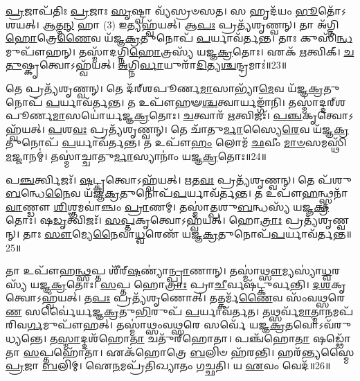 \-\ul{𑌪𑍍𑌰}\-𑌜𑌾\-𑌪᳴𑌤𑌿𑌃 \ul{𑌪𑍍𑌰}\-𑌜𑌾𑌃 \ul{𑌸𑍃}\-𑌷𑍍𑌟𑍍𑌵𑌾 𑌵𑍍𑌯᳴𑌸𑍍𑌰𑍞𑌸𑌤।
𑌸 𑌹𑍃𑌦᳴𑌯𑌂 \ul{𑌭𑍂}\-𑌤𑍋᳴\-𑌽𑌶𑌯𑌤𑍍।
𑌆\-\ul{𑌤𑍍𑌮}\-\-\ul{𑌨𑍍} 𑌹𑌾 (3) 𑌇𑌤𑍍𑌯𑌹𑍍𑌵᳴𑌯𑌤𑍍।
𑌆\-\ul{𑌪𑌃} 𑌪𑍍𑌰𑌤𑍍𑌯᳴𑌶𑍃𑌣𑍍𑌵𑌨𑍍।
𑌤𑌾 𑌅᳴𑌗𑍍𑌨𑌿\-\ul{𑌹𑍋}\-𑌤𑍍𑌰𑍇\-\ul{𑌣𑍈}\-𑌵 𑌯᳴𑌜𑍍𑌞\-\ul{𑌕𑍍𑌰}\-𑌤𑍁𑌨𑍋𑌪᳴ \ul{𑌪}\-𑌰𑍍𑌯𑌾𑌵᳴𑌰𑍍𑌤𑌨𑍍𑌤।
𑌤𑌾𑌃 𑌕𑍁𑌸𑌿᳴\-\ul{𑌨𑍍𑌧}\-𑌮𑍁𑌪𑍗᳴𑌹𑌨𑍍।
𑌤𑌸𑍍𑌮𑌾᳴𑌦𑌗𑍍𑌨𑌿\-\ul{𑌹𑍋}\-𑌤𑍍𑌰𑌸𑍍𑌯᳴ 𑌯𑌜𑍍𑌞\-\ul{𑌕𑍍𑌰}\-𑌤𑍋𑌃।
𑌏𑌕᳴ \ul{𑌋}\-𑌤𑍍𑌵𑌿𑌕𑍍।
\-\ul{𑌚}\-\-\ul{𑌤𑍁}\-𑌷𑍍𑌕𑍃𑌤𑍍𑌵𑍋\-𑌽𑌹𑍍𑌵᳴𑌯𑌤𑍍।
\-\ul{𑌅}\-𑌗𑍍𑌨𑌿\-\ul{𑌰𑍍𑌵𑌾}\-𑌯𑍁𑌰𑌾᳴\-\ul{𑌦𑌿}\-𑌤𑍍𑌯\-\ul{𑌶𑍍𑌚}\-𑌨𑍍𑌦𑍍𑌰𑌮𑌾𑌃॑॥23॥

𑌤𑍇 𑌪𑍍𑌰𑌤𑍍𑌯᳴𑌶𑍃𑌣𑍍𑌵𑌨𑍍।
𑌤𑍇 𑌦᳴𑌰𑍍‌\mbox{}𑌶𑌪𑍂𑌰𑍍𑌣\-\ul{𑌮𑌾}\-𑌸𑌾𑌭𑍍𑌯𑌾᳴\-\ul{𑌮𑍇}\-𑌵 𑌯᳴𑌜𑍍𑌞\-\ul{𑌕𑍍𑌰}\-𑌤𑍁𑌨𑍋𑌪᳴ \ul{𑌪}\-𑌰𑍍𑌯𑌾𑌵᳴𑌰𑍍𑌤𑌨𑍍𑌤।
𑌤 𑌉𑌪𑍗᳴𑌹𑍟\-\ul{𑌶𑍍𑌚}\-𑌤𑍍𑌵𑌾𑌰𑍍𑌯𑌙𑍍𑌗𑌾᳴𑌨𑌿।
𑌤𑌸𑍍𑌮𑌾॑𑌦𑍍𑌦𑌰𑍍‌\mbox{}𑌶𑌪𑍂𑌰𑍍𑌣\-\-\ul{𑌮𑌾}\-𑌸𑌯𑍋॑𑌰𑍍𑌯𑌜𑍍𑌞\-\ul{𑌕𑍍𑌰}\-𑌤𑍋𑌃।
\-\ul{𑌚}\-𑌤𑍍𑌵𑌾𑌰᳴ \ul{𑌋}\-𑌤𑍍𑌵𑌿𑌜𑌃᳴।
\-\ul{𑌪}\-\-\ul{𑌞𑍍𑌚}\-𑌕𑍃𑌤𑍍𑌵𑍋\-𑌽𑌹𑍍𑌵᳴𑌯𑌤𑍍।
\-\ul{𑌪}\-𑌶\-\ul{𑌵𑌃} 𑌪𑍍𑌰𑌤𑍍𑌯᳴𑌶𑍃𑌣𑍍𑌵𑌨𑍍।
𑌤𑍇 𑌚𑌾᳴𑌤𑍁\-\ul{𑌰𑍍𑌮𑌾}\-𑌸𑍍𑌯𑍈\-\ul{𑌰𑍇}\-𑌵 𑌯᳴𑌜𑍍𑌞\-\ul{𑌕𑍍𑌰}\-𑌤𑍁𑌨𑍋𑌪᳴ \ul{𑌪}\-𑌰𑍍𑌯𑌾𑌵᳴𑌰𑍍𑌤𑌨𑍍𑌤।
𑌤 𑌉𑌪𑍗᳴\-\ul{𑌹𑌂} 𑌲𑍋𑌮᳴ \ul{𑌛}\-𑌵𑍀𑌂 \ul{𑌮𑌾}\-\-\ul{𑍞}\-𑌸𑌮𑌸𑍍𑌥𑌿᳴ \ul{𑌮}\-𑌜𑍍𑌜𑌾𑌨𑌮𑍍॑।
𑌤𑌸𑍍𑌮𑌾॑𑌚𑍍𑌚𑌾𑌤𑍁\-\ul{𑌰𑍍𑌮𑌾}\-𑌸𑍍𑌯𑌾𑌨𑌾𑌂॑ 𑌯𑌜𑍍𑌞\-\ul{𑌕𑍍𑌰}\-𑌤𑍋𑌃॥24॥

𑌪\-\ul{𑌞𑍍𑌚}\-𑌰𑍍𑌤𑍍𑌵𑌿𑌜𑌃᳴।
\-\ul{𑌷}\-𑌟𑍍𑌕𑍃𑌤𑍍𑌵𑍋\-𑌽𑌹𑍍𑌵᳴𑌯𑌤𑍍।
\-\ul{𑌋}\-𑌤\-\ul{𑌵𑌃} 𑌪𑍍𑌰𑌤𑍍𑌯᳴𑌶𑍃𑌣𑍍𑌵𑌨𑍍।
𑌤𑍇 𑌪᳴𑌶𑍁\-\ul{𑌬}\-𑌨𑍍𑌧𑍇\-\ul{𑌨𑍈}\-𑌵 𑌯᳴𑌜𑍍𑌞\-\ul{𑌕𑍍𑌰}\-𑌤𑍁𑌨𑍋𑌪᳴\-\ul{𑌪}\-𑌰𑍍𑌯𑌾𑌵᳴𑌰𑍍𑌤𑌨𑍍𑌤।
𑌤 𑌉𑌪𑍗᳴\-\ul{𑌹}\-𑌨𑍍𑌥𑍍𑌸𑍍𑌤𑌨𑌾᳴\-\ul{𑌵𑌾}\-𑌣𑍍𑌡𑍗 \ul{𑌶𑌿}\-𑌶𑍍𑌞𑌮𑌵𑌾॑𑌞𑍍𑌚𑌂 \ul{𑌪𑍍𑌰𑌾}\-𑌣𑌮𑍍।
𑌤𑌸𑍍𑌮𑌾॑𑌤𑍍𑌪𑌶𑍁\-\ul{𑌬}\-𑌨𑍍𑌧𑌸𑍍𑌯᳴ 𑌯𑌜𑍍𑌞\-\ul{𑌕𑍍𑌰}\-𑌤𑍋𑌃।
𑌷\-\ul{𑌡𑍃}\-𑌤𑍍𑌵𑌿𑌜𑌃᳴।
\-\ul{𑌸}\-\-\ul{𑌪𑍍𑌤}\-𑌕𑍃𑌤𑍍𑌵𑍋\-𑌽𑌹𑍍𑌵᳴𑌯𑌤𑍍।
𑌹𑍋\-\ul{𑌤𑍍𑌰𑌾𑌃} 𑌪𑍍𑌰𑌤𑍍𑌯᳴𑌶𑍃𑌣𑍍𑌵𑌨𑍍।
𑌤𑌾𑌃 \ul{𑌸𑍗}\-𑌮𑍍𑌯𑍇\-\ul{𑌨𑍈}\-𑌵𑌾\-\ul{𑌧𑍍𑌵}\-𑌰𑍇𑌣᳴ 𑌯𑌜𑍍𑌞\-\ul{𑌕𑍍𑌰}\-𑌤𑍁𑌨𑍋𑌪᳴\-\ul{𑌪}\-𑌰𑍍𑌯𑌾𑌵᳴𑌰𑍍𑌤𑌨𑍍𑌤॥25॥

𑌤𑌾 𑌉𑌪𑍗᳴𑌹\-\ul{𑌨𑍍𑌥𑍍𑌸}\-𑌪𑍍𑌤 𑌶𑍀᳴𑌰𑍍‌\mbox{}\-\ul{𑌷}\-𑌣𑍍𑌯𑌾॑\-\ul{𑌨𑍍𑌪𑍍𑌰𑌾}\-𑌣𑌾𑌨𑍍।
𑌤𑌸𑍍𑌮𑌾॑\-\ul{𑌥𑍍𑌸𑍗}\-𑌮𑍍𑌯𑌸𑍍𑌯𑌾॑\-\ul{𑌧𑍍𑌵}\-𑌰𑌸𑍍𑌯᳴ 𑌯𑌜𑍍𑌞\-\ul{𑌕𑍍𑌰}\-𑌤𑍋𑌃।
\-\ul{𑌸}\-𑌪𑍍𑌤 𑌹𑍋\-\ul{𑌤𑍍𑌰𑌾𑌃} 𑌪𑍍𑌰𑌾\-\ul{𑌚𑍀}\-𑌰𑍍𑌵𑌷᳴𑌟𑍍𑌕𑍁𑌰𑍍𑌵𑌨𑍍𑌤𑌿।
\-\ul{𑌦}\-\-\ul{𑌶}\-𑌕𑍃𑌤𑍍𑌵𑍋\-𑌽𑌹𑍍𑌵᳴𑌯𑌤𑍍।
𑌤\-\ul{𑌪𑌃} 𑌪𑍍𑌰𑌤𑍍𑌯᳴𑌶𑍃𑌣𑍋𑌤𑍍।
𑌤𑌤𑍍𑌕𑌰𑍍𑌮᳴\-\ul{𑌣𑍈}\-𑌵 𑌸𑌂᳴𑌵\-\ul{𑌥𑍍𑌸}\-𑌰𑍇\-\ul{𑌣} 𑌸𑌰𑍍𑌵𑍈॑𑌰𑍍𑌯𑌜𑍍𑌞\-\ul{𑌕𑍍𑌰}\-𑌤𑍁\-\ul{𑌭𑌿}\-𑌰𑍁𑌪᳴ \ul{𑌪}\-𑌰𑍍𑌯𑌾𑌵᳴𑌰𑍍𑌤𑌤।
𑌤𑌥𑍍𑌸𑌰𑍍𑌵᳴\-\ul{𑌮𑌾}\-𑌤𑍍𑌮𑌾\-\ul{𑌨}\-𑌮𑌪᳴𑌰𑌿𑌵\-\ul{𑌰𑍍𑌗}\-𑌮𑍁𑌪𑍗᳴𑌹𑌤𑍍।
𑌤𑌸𑍍𑌮𑌾॑𑌥𑍍𑌸𑌂𑌵\-\ul{𑌥𑍍𑌸}\-𑌰𑍇 𑌸𑌰𑍍𑌵𑍇᳴ 𑌯𑌜𑍍𑌞\-\ul{𑌕𑍍𑌰}\-𑌤𑌵𑍋\-𑌽𑌵᳴𑌰𑍁𑌧𑍍𑌯𑌨𑍍𑌤𑍇।
𑌤\-\ul{𑌸𑍍𑌮𑌾}\-𑌦𑍍𑌦𑌶᳴𑌹𑍋\-\ul{𑌤𑌾} 𑌚𑌤𑍁᳴𑌰𑍍‌\mbox{}𑌹𑍋𑌤𑌾।
𑌪𑌞𑍍𑌚᳴𑌹𑍋\-\ul{𑌤𑌾} 𑌷𑌡𑍍𑌢𑍋᳴𑌤𑌾 \ul{𑌸}\-𑌪𑍍𑌤𑌹𑍋᳴𑌤𑌾।
𑌏𑌕᳴𑌹𑍋𑌤𑍍𑌰𑍇 \ul{𑌬}\-𑌲𑌿𑍞 𑌹᳴𑌰𑌨𑍍𑌤𑌿।
𑌹𑌰᳴𑌨𑍍𑌤𑍍𑌯𑌸𑍍𑌮𑍈 \ul{𑌪𑍍𑌰}\-𑌜𑌾 \ul{𑌬}\-𑌲𑌿𑌮𑍍।
𑌐\-\ul{𑌨}\-𑌮𑌪𑍍𑌰᳴𑌤𑌿𑌖𑍍𑌯𑌾𑌤𑌂 𑌗𑌚𑍍𑌛𑌤𑌿।
𑌯 \ul{𑌏}\-𑌵𑌂 𑌵𑍇𑌦᳴॥26॥\anuvakamend[\-\ul{𑌚}\-𑌨𑍍𑌦𑍍𑌰𑌮𑌾॑𑌶𑍍𑌚𑌾𑌤𑍁\-\ul{𑌰𑍍𑌮𑌾}\-𑌸𑍍𑌯𑌾𑌨𑌾𑌂॑ 𑌯𑌜𑍍𑌞\-\ul{𑌕𑍍𑌰}\-𑌤𑍋𑌰᳴\-\ul{𑌧𑍍𑌵}\-𑌰𑍇𑌣᳴ 𑌯𑌜𑍍𑌞\-\ul{𑌕𑍍𑌰}\-𑌤𑍁𑌨𑍋𑌪᳴ \ul{𑌪}\-𑌰𑍍𑌯𑌾𑌵᳴𑌰𑍍𑌤𑌨𑍍𑌤 \ul{𑌸}\-𑌪𑍍𑌤𑌹𑍋᳴𑌤𑌾 \ul{𑌚}\-𑌤𑍍𑌵𑌾𑌰𑌿᳴ 𑌚]

